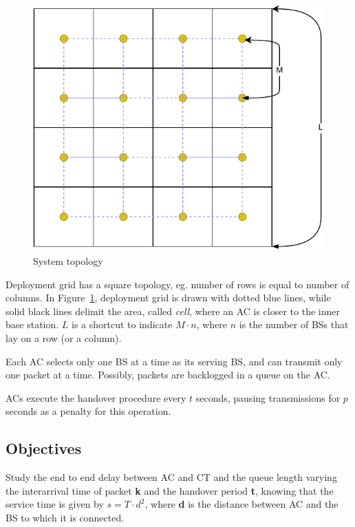 \documentclass[a4paper,12pt]{article}
\begin{document}
\begin{figure}[H]
  \centering
  \includegraphics[scale=0.5]{img/grid.pdf}
  \caption{System topology}
  \label{fig:grid}
\end{figure}

Deployment grid has a square topology, eg. number of rows is equal to number of columns.
In Figure~\ref{fig:grid}, deployment grid is drawn with dotted blue lines, while solid black lines delimit the area, called \emph{cell}, where an AC is closer to the inner base station.
$L$ is a shortcut to indicate $M \cdot n$, where $n$ is the number of BSs that lay on a row (or a column).

Each AC selects only one BS at a time as its serving BS, and can transmit only one packet at a time.
Possibly, packets are backlogged in a queue on the AC.

ACs execute the handover procedure every $t$ seconds, pausing transmissions for $p$ seconds as a penalty for this operation.

\subsection{Objectives}
Study the end to end delay between AC and CT and the queue length varying the interarrival time of packet \textbf{k} and the handover period \textbf{t}, knowing that
the service time is given by $s = T \cdot d^{2}$, where \textbf{d} is the distance between AC and the BS to which it is connected.
\end{document}
